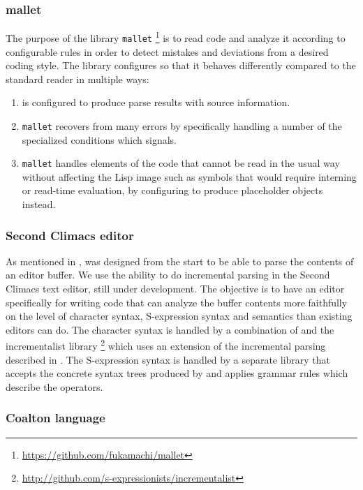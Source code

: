 \subsubsection{mallet}

The purpose of the library \texttt{mallet}%
\footnote{\url{https://github.com/fukamachi/mallet}} is to read \cl{}
code and analyze it according to configurable rules in order to detect
mistakes and deviations from a desired coding style.  The library
configures \eclector{} so that it behaves differently compared to the
standard reader in multiple ways:

\begin{enumerate}
\item \eclector{} is configured to produce parse results with source
  information.
\item \texttt{mallet} recovers from many errors by specifically
  handling a number of the specialized conditions which \eclector{}
  signals.
\item \texttt{mallet} handles elements of the code that cannot be read
  in the usual way without affecting the Lisp image such as symbols
  that would require interning or read-time evaluation, by configuring
  \eclector{} to produce placeholder objects instead.
\end{enumerate}

\subsubsection{Second Climacs editor}

As mentioned in , \eclector{} was designed from
the start to be able to parse the contents of an editor buffer.  We
use the ability to do incremental parsing in the Second Climacs text
editor, still under development.  The objective is to have an editor
specifically for writing \cl{} code that can analyze the buffer
contents more faithfully on the level of character syntax,
S-expression syntax and semantics than existing editors can do.  The
character syntax is handled by a combination of \eclector{} and the
incrementalist library%
\footnote{\url{http://github.com/s-expressionists/incrementalist}}
which uses an extension of the incremental parsing described in
.  The S-expression syntax is handled
by a separate library that accepts the concrete syntax trees produced
by \eclector{} and applies grammar rules which describe the \cl{}
operators.

\subsubsection{Coalton language}

